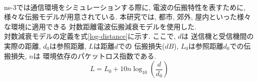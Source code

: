 \\[1em]
\indent ns-3では通信環境をシミュレーションする際に, 
電波の伝搬特性を表すために, 様々な伝搬モデルが用意されている. 
本研究では, 都市, 郊外, 屋内といった様々な環境に適用できる
対数距離電波伝搬減衰モデルを使用した.\\ 
\indent 対数減衰モデルの定義を式\ref{log-distance}に示す. ここで, $d$は
送信機と受信機間の実際の距離, $d_0$は参照距離, $L$は距離$d$での
伝搬損失($dB$), $L_0$は参照距離$d_0$での伝搬損失, $n$は
環境依存のパケットロス指数である. \\
\begin{equation}\label{log-distance}
  L = L_0 + 10n\log_{10}\left(\frac{d}{d_0}\right)
\end{equation}